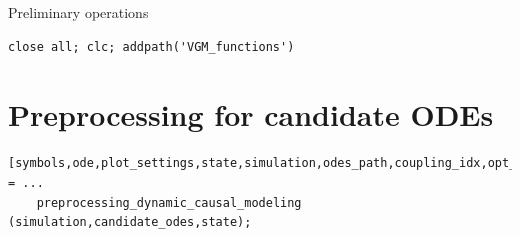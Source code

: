 \begin{par}
Preliminary operations
\end{par} \vspace{1em}
\color{RoyalPurple}\begin{verbatim}
close all; clc; addpath('VGM_functions')
\end{verbatim} 
\color{black}


\section{Preprocessing for candidate ODEs}

\color{RoyalPurple}\begin{verbatim}
[symbols,ode,plot_settings,state,simulation,odes_path,coupling_idx,opt_settings] = ...
    preprocessing_dynamic_causal_modeling (simulation,candidate_odes,state);
\end{verbatim} 
\color{black}
